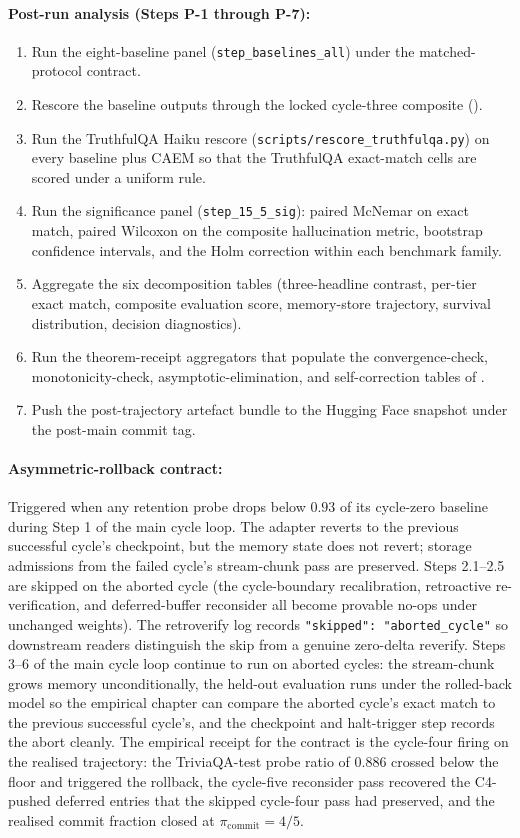 \paragraph{Post-run analysis (Steps P-1 through P-7):}
\begin{enumerate}
\item Run the eight-baseline panel (\verb|step_baselines_all|) under the matched-protocol contract.
\item Rescore the baseline outputs through the locked cycle-three composite ().
\item Run the TruthfulQA Haiku rescore (\verb|scripts/rescore_truthfulqa.py|) on every baseline plus CAEM so that the TruthfulQA exact-match cells are scored under a uniform rule.
\item Run the significance panel (\verb|step_15_5_sig|): paired McNemar on exact match, paired Wilcoxon on the composite hallucination metric, bootstrap confidence intervals, and the Holm correction within each benchmark family.
\item Aggregate the six decomposition tables (three-headline contrast, per-tier exact match, composite evaluation score, memory-store trajectory, survival distribution, decision diagnostics).
\item Run the theorem-receipt aggregators that populate the convergence-check, monotonicity-check, asymptotic-elimination, and self-correction tables of .
\item Push the post-trajectory artefact bundle to the Hugging Face snapshot under the post-main commit tag.
\end{enumerate}

\paragraph{Asymmetric-rollback contract:} Triggered when any retention probe drops below $0.93$ of its cycle-zero baseline during Step 1 of the main cycle loop. The adapter reverts to the previous successful cycle's checkpoint, but the memory state does not revert; storage admissions from the failed cycle's stream-chunk pass are preserved. Steps 2.1--2.5 are skipped on the aborted cycle (the cycle-boundary recalibration, retroactive re-verification, and deferred-buffer reconsider all become provable no-ops under unchanged weights). The retroverify log records \verb|"skipped": "aborted_cycle"| so downstream readers distinguish the skip from a genuine zero-delta reverify. Steps 3--6 of the main cycle loop continue to run on aborted cycles: the stream-chunk grows memory unconditionally, the held-out evaluation runs under the rolled-back model so the empirical chapter can compare the aborted cycle's exact match to the previous successful cycle's, and the checkpoint and halt-trigger step records the abort cleanly. The empirical receipt for the contract is the cycle-four firing on the realised trajectory: the TriviaQA-test probe ratio of $0.886$ crossed below the floor and triggered the rollback, the cycle-five reconsider pass recovered the C4-pushed deferred entries that the skipped cycle-four pass had preserved, and the realised commit fraction closed at $\pi_{\mathrm{commit}} = 4/5$.

